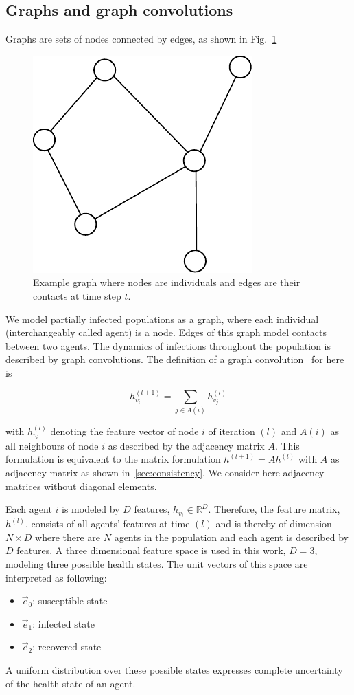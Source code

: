 
\subsection{Graphs and graph convolutions}

Graphs are sets of nodes connected by edges, as shown in Fig.~\ref{fig:graph_example}

\begin{figure}[H]
	\centering
	\includegraphics[width=0.4\columnwidth]{img/graph_example.pdf}
	\caption{Example graph where nodes are individuals and edges are their contacts at time step $t$.}%
	\label{fig:graph_example}
\end{figure}

We model partially infected populations as a graph, where each individual (interchangeably called agent) is a node. Edges of this graph model contacts between two agents. The dynamics of infections throughout the population is described by graph convolutions. The definition of a graph convolution~\cite{Kipf2017SemiSupervisedCW} for here is

\begin{equation}
	\label{eq:graph_convolution}
	h_{v_i}^{(l+1)} = \sum_{j\in A(i)} h_{v_j}^{(l)}
\end{equation}

with $h_{v_i}^{(l)}$ denoting the feature vector of node $i$ of iteration $(l)$ and $A(i)$ as all neighbours of node $i$ as described by the adjacency matrix $A$. This formulation is equivalent to the matrix formulation $h^{(l+1)} = A h^{(l)}$ with $A$ as adjacency matrix as shown in~\ref{sec:consistency}. We consider here adjacency matrices without diagonal elements.

Each agent $i$ is modeled by $D$ features, $h_{v_i} \in \mathbb{R}^D$. Therefore, the feature matrix, $h^{(l)}$, consists of all agents' features at time $(l)$ and is thereby of dimension $N\times D$ where there are $N$ agents in the population and each agent is described by $D$ features. A three dimensional feature space is used in this work, $D=3$, modeling three possible health states. The unit vectors of this space are interpreted as following:
\begin{itemize}
	\item $\vec{e}_0$: susceptible state
	\item $\vec{e}_1$: infected state
	\item $\vec{e}_2$: recovered state
\end{itemize}
A uniform distribution over these possible states expresses complete uncertainty of the health state of an agent.

